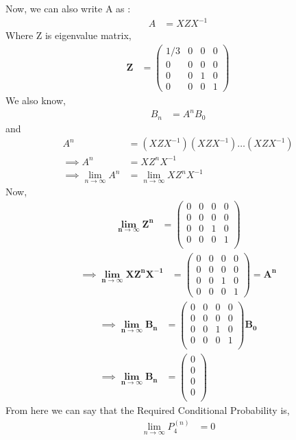 \documentclass[journal,12pt,onecolumn]{IEEEtran}
\begin{document}
Now, we can also write A as :\\
\begin{align}
A &= XZX^{-1}
\end{align}
Where Z is eigenvalue matrix,\\
\begin{align}
\mathbf{Z} &=
\begin{pmatrix}
1/3 & 0 & 0 & 0\\
0 & 0 & 0 & 0\\
0 & 0 & 1 & 0\\
0 & 0 & 0 & 1
\end{pmatrix}
\end{align}
We also know,
\begin{align}
B_n &= A^{n}B_0
\end{align}
and
\begin{align}
A^{n} &= (XZX^{-1})(XZX^{-1}) \dots (XZX^{-1})\\
\implies A^{n} &= XZ^{n}X^{-1}\\
\implies \lim_{n \to \infty}A^{n} &= \lim_{n \to \infty}XZ^{n}X^{-1}
\end{align}
Now,
\begin{align}
\mathbf{\lim_{n \to \infty}Z^{n}} &= 
\begin{pmatrix}
0 & 0 & 0 & 0\\
0 & 0 & 0 & 0\\
0 & 0 & 1 & 0\\
0 & 0 & 0 & 1\\
\end{pmatrix}
\end{align}
\begin{align}
\implies \mathbf{\lim_{n \to \infty}XZ^{n}X^{-1}} &= 
\begin{pmatrix}
0 & 0 & 0 & 0\\
0 & 0 & 0 & 0\\
0 & 0 & 1 & 0\\
0 & 0 & 0 & 1
\end{pmatrix}
 = \mathbf{A^{n}}
 \end{align}
\begin{align}
\implies \mathbf{\lim_{n \to \infty}B_n} &=
\begin{pmatrix}
0 & 0 & 0 & 0\\
0 & 0 & 0 & 0\\
0 & 0 & 1 & 0\\
0 & 0 & 0 & 1\\
\end{pmatrix} \mathbf{B_0}\\
\implies \mathbf{\lim_{n \to \infty}B_n} &= 
\begin{pmatrix}
0 \\[4pt]
0\\[4pt]
0\\[4pt]
0\\[4pt]
\end{pmatrix}
\end{align}
From here we can say that the Required Conditional Probability is,
\begin{align}
    \lim_{n \to \infty} P_{4}^{(n)} &= 0
\end{align}
\end{document}
